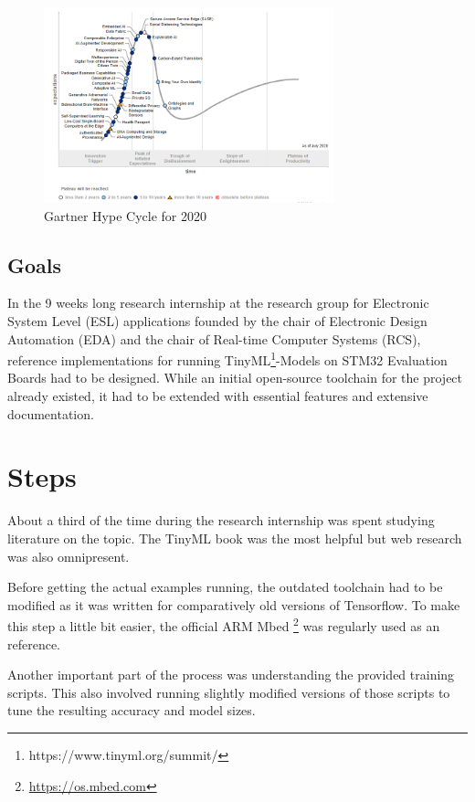 \documentclass[oneside]{tum-book}
\begin{document}
\begin{figure}[h]
\centering
\includegraphics[width=0.75\textwidth]{figures/2020_08_23_medialist_gartner_hype_cycle_2020.png}
\caption{Gartner Hype Cycle for 2020 \cite{2020hypecycles}}
\label{fig:gartner2020}
\end{figure}

\section{Goals}

In the 9 weeks long research internship at the research group for Electronic System Level (ESL) applications founded by the chair of Electronic Design Automation (EDA) and the chair of Real-time Computer Systems (RCS), reference implementations for running TinyML\footnote{https://www.tinyml.org/summit/}-Models on STM32 Evaluation Boards had to be designed. While an initial open-source toolchain for the project already existed, it had to be extended with essential features and extensive documentation.

\chapter{Steps}

About a third of the time during the research internship was spent studying literature on the topic. The TinyML book \cite{warden2020tinyml} was the most helpful but web research was also omnipresent.

Before getting the actual examples running, the outdated toolchain had to be modified as it was written for comparatively old versions of Tensorflow. To make this step a little bit easier, the official ARM Mbed \footnote{\url{https://os.mbed.com}} was regularly used as an reference.

Another important part of the process was understanding the provided training scripts. This also involved running slightly modified versions of those scripts to tune the resulting accuracy and model sizes.
\end{document}
